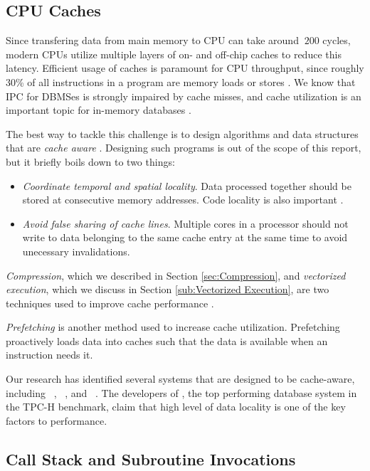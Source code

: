 \subsection{CPU Caches}
\label{sub:CPU Caches}
Since transfering data from main memory to CPU can take around $~200$ cycles, modern CPUs utilize multiple layers of on- and off-chip caches to reduce this latency. Efficient usage of caches is paramount for CPU throughput, since roughly 30\% of all instructions in a program are memory loads or stores \cite{Boncz2005-wj}. We know that IPC for DBMSes is strongly impaired by cache misses, and cache utilization is an important topic for in-memory databases \cite{Exasol2014-xh}.

The best way to tackle this challenge is to design algorithms and data structures that are \textit{cache aware} \cite{Farber2012-vh}. Designing such programs is out of the scope of this report, but it briefly boils down to two things:
\begin{itemize}
  \item \textit{Coordinate temporal and spatial locality}. Data processed together should be stored at consecutive memory addresses. Code locality is also important \cite{Neumann2011-uq}.
  \item \textit{Avoid false sharing of cache lines}. Multiple cores in a processor should not write to data belonging to the same cache entry at the same time to avoid unecessary invalidations.
\end{itemize}
\textit{Compression}, which we described in Section \ref{sec:Compression}, and \textit{vectorized execution}, which we discuss in Section \ref{sub:Vectorized Execution}, are two techniques used to improve cache performance \cite{Larson2013-mc, Lemke2010-is}.

\textit{Prefetching} is another method used to increase cache utilization. Prefetching proactively loads data into caches such that the data is available when an instruction needs it.

Our research has identified several systems that are designed to be cache-aware, including \monetdb~\cite{Boncz2002-yj}, \mssql~\cite{Lahiri2015-mz}, and \ibm~\cite{Raman2013-em}. The developers of \exasol, the top performing database system in the TPC-H benchmark, claim that high level of data locality is one of the key factors to performance.

\subsection{Call Stack and Subroutine Invocations}
\label{sub:Call Stack and Subroutine Invocations}


